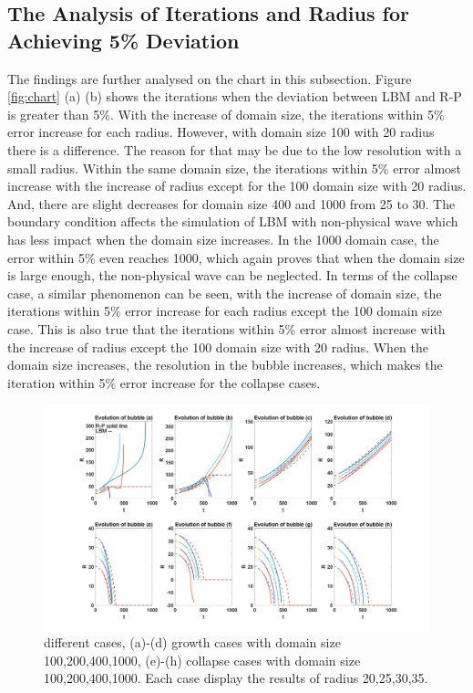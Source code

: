 \documentclass[review]{elsarticle}
\begin{document}
\subsection{The Analysis of Iterations and Radius for Achieving 5\% Deviation}
The findings are further analysed on the chart in this subsection. Figure \ref{fig:chart} (a) (b) shows the iterations when the deviation between LBM and R-P is greater than 5\%. With the increase of domain size, the iterations within 5\% error increase for each radius. However, with domain size 100 with 20 radius there is a difference. The reason for that may be due to the low resolution with a small radius. Within the same domain size, the iterations within 5\% error almost increase with the increase of radius except for the 100 domain size with 20 radius. And, there are slight decreases for domain size 400 and 1000 from 25 to 30. The boundary condition affects the simulation of LBM with non-physical wave which has less impact when the domain size increases. In the 1000 domain case, the error within 5\% even reaches 1000, which again proves that when the domain size is large enough, the non-physical wave can be neglected. In terms of the collapse case, a similar phenomenon can be seen, with the increase of domain size, the iterations within 5\% error increase for each radius except the 100 domain size case. This is also true that the iterations within 5\% error almost increase with the increase of radius except the 100 domain size with 20 radius. When the domain size increases, the resolution in the bubble increases, which makes the iteration within 5\% error increase for the collapse cases. 
\begin{figure}[htp]
	\centering
	\includegraphics[width=1\textwidth,height=0.5\textheight]{bubble-curve}
	\caption{different cases, (a)-(d) growth cases with domain size 100,200,400,1000, (e)-(h) collapse cases with domain size 100,200,400,1000. Each case display the results of radius 20,25,30,35. }
	\label{fig:bubble}
\end{figure}
\end{document}
